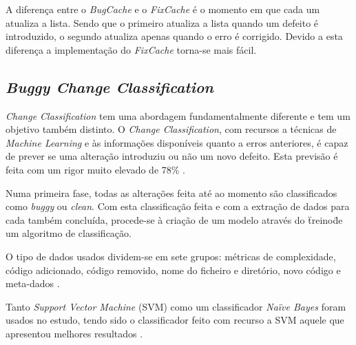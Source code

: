 A diferença entre o \emph{BugCache} e o \emph{FixCache} é o momento em que cada um atualiza a lista. Sendo que o primeiro atualiza a lista quando um defeito é introduzido, o segundo atualiza apenas quando o erro é corrigido. Devido a esta diferença a implementação do \emph{FixCache} torna-se mais fácil.

\subsection{\emph{Buggy Change Classification}}

\emph{Change Classification} tem uma abordagem fundamentalmente diferente e tem um objetivo também distinto. O \emph{Change Classification}, com recursos a técnicas de \emph{Machine Learning} e às informações disponíveis quanto a erros anteriores, é capaz de prever se uma alteração introduziu ou não um novo defeito. Esta previsão é feita com um rigor muito elevado de 78\% \cite{Whitehead2008}.

Numa primeira fase, todas as alterações feita até ao momento são classificados como \emph{buggy} ou \emph{clean}. Com esta classificação feita e com a extração de dados para cada também concluída, procede-se à criação de um modelo através do \"treino\" de um algoritmo de classificação.

O tipo de dados usados dividem-se em sete grupos: métricas de complexidade, código adicionado, código removido, nome do ficheiro e diretório, novo código e meta-dados \cite{Whitehead2008}.

Tanto \emph{Support Vector Machine} (SVM) como um classificador \emph{Naïve Bayes} foram usados no estudo, tendo sido o classificador feito com recurso a SVM aquele que apresentou melhores resultados \cite{Whitehead2008}.